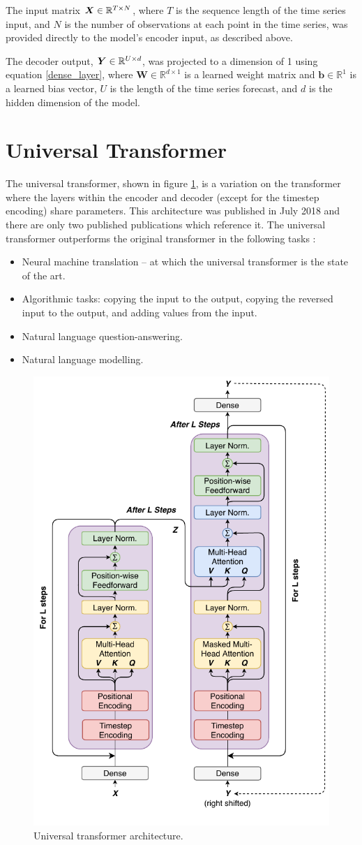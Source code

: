 The input matrix ${\bm{X}} \in \mathbb{R}^{T \times N}$, where $T$ is the sequence length of the time series input, and $N$ is the number of observations at each point in the time series, was provided directly to the model's encoder input, as described above.

The decoder output, ${\bm{Y}} \in \mathbb{R}^{U \times d}$, was projected to a dimension of 1 using equation \ref{dense_layer}, where $\boldsymbol{W} \in \mathbb{R}^{d \times 1}$ is a learned weight matrix and $\boldsymbol{b} \in \mathbb{R}^{1}$ is a learned bias vector, $U$ is the length of the time series forecast, and $d$ is the hidden dimension of the model.

\section{Universal Transformer} \label{sec:universal_transformer}
The universal transformer, shown in figure \ref{fig:universal_transformer}, is a variation on the transformer where the layers within the encoder and decoder (except for the timestep encoding) share parameters.
This architecture was published in July 2018 \cite{Dehghani2018} and there are only two published publications which reference it.
The universal transformer outperforms the original transformer in the following tasks \cite{Dehghani2018}:
\begin{itemize}
	\item Neural machine translation -- at which the universal transformer is the state of the art.
	\item Algorithmic tasks: copying the input to the output, copying the reversed input to the output, and adding values from the input.
	\item Natural language question-answering.
	\item Natural language modelling.
\end{itemize}

\begin{figure}[htbp]
	\centerline{\includegraphics[width=.5\textwidth]{images/universal_transformer.pdf}}
	\caption{Universal transformer architecture.}
	\label{fig:universal_transformer}
\end{figure}

